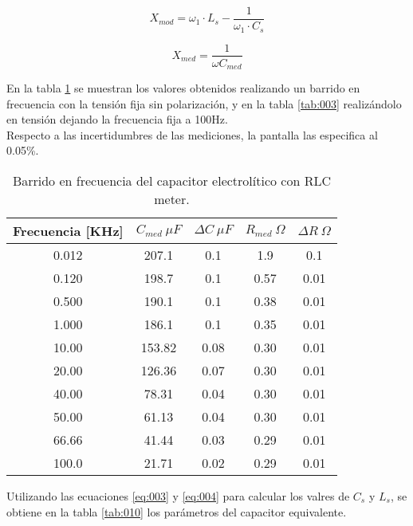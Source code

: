 \documentclass[a4paper,10pt]{article}
\begin{document}
		\begin{equation}\label{eq:001}
			X_{mod} = \omega_1\cdot L_s - \frac{1}{\omega_1\cdot C_s}
		\end{equation}
	
		\begin{equation}\label{eq:002}
			X_{med} = \frac{1}{\omega C_{med}}
		\end{equation}

		\indent En la tabla \ref{tab:002} se muestran los valores obtenidos 
		realizando un barrido en frecuencia con la tensión fija sin 
		polarización, y en la tabla \ref{tab:003} realizándolo en tensión 
		dejando la frecuencia fija a 100Hz. \\
		\indent Respecto a las incertidumbres de las mediciones, la pantalla las
		especifica al 0.05\%. 

		\begin{table}[!htp]
			\centering
			\begin{tabular}{|c|c|c|c|c|}
				\hline
				Frecuencia [KHz] & $C_{med}~\mu F$ & $\Delta C~\mu F$ & 
				$R_{med}~\Omega$ & $\Delta R~\Omega$ \\
				\hline
				0.012 &	207.1 & 0.1 & 1.9 & 0.1 \\
				\hline
				0.120 &	198.7 & 0.1 & 0.57 & 0.01 \\
				\hline
				0.500 &	190.1 & 0.1 & 0.38 & 0.01 \\
				\hline
				1.000 &	186.1 & 0.1 & 0.35 & 0.01 \\
				\hline
				10.00 &	153.82 & 0.08 & 0.30 & 0.01 \\
				\hline
				20.00 &	126.36 & 0.07 & 0.30 & 0.01 \\   
				\hline
				40.00 &	78.31 & 0.04 & 0.30 & 0.01 \\
				\hline
				50.00 &	61.13 & 0.04 & 0.30 & 0.01 \\
				\hline
				66.66 &	41.44 & 0.03 & 0.29 & 0.01 \\
				\hline
				100.0 &	21.71 & 0.02 & 0.29 & 0.01 \\
				\hline	  
			\end{tabular}
			\caption{Barrido en frecuencia del capacitor electrolítico con RLC 
			meter.} 
			\label{tab:002}
		\end{table}	

		\indent Utilizando las ecuaciones \ref{eq:003} y \ref{eq:004} para 
		calcular los valres de $C_s$ y $L_s$, se obtiene en la tabla 
		\ref{tab:010} los parámetros del capacitor equivalente.
\end{document}
